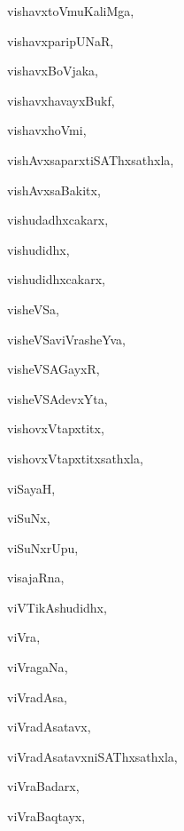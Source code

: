 \begin{multicols}{3}
{\noindent
{vishavxtoVmuKaliMga}, \pageref{vishavxtoVmuKaliMga}

\noindent
{vishavxparipUNaR}, \pageref{vishavxparipUNaR}

\noindent
{vishavxBoVjaka}, \pageref{vishavxBoVjaka}

\noindent
{vishavxhavayxBukf}, \pageref{vishavxhavayxBukf}

\noindent
{vishavxhoVmi}, \pageref{vishavxhoVmi}

\noindent
{vishAvxsaparxtiSAThxsathxla}, \pageref{vishAvxsaparxtiSAThxsathxla}

\noindent
{vishAvxsaBakitx}, \pageref{vishAvxsaBakitx}

\noindent
{vishudadhxcakarx}, \pageref{vishudadhxcakarx}

\noindent
{vishudidhx}, \pageref{vishudidhx}

\noindent
{vishudidhxcakarx}, \pageref{vishudidhxcakarx}

\noindent
{visheVSa}, \pageref{visheVSa}

\noindent
{visheVSaviVrasheYva}, \pageref{visheVSaviVrasheYva}

\noindent
{visheVSAGayxR}, \pageref{visheVSAGayxR}

\noindent
{visheVSAdevxYta}, \pageref{visheVSAdevxYta}

\noindent
{vishovxVtapxtitx}, \pageref{vishovxVtapxtitx}

\noindent
{vishovxVtapxtitxsathxla}, \pageref{vishovxVtapxtitxsathxla}

\noindent
{viSayaH}, \pageref{viSayaH}

\noindent
{viSuNx}, \pageref{viSuNx}

\noindent
{viSuNxrUpu}, \pageref{viSuNxrUpu}

\noindent
{visajaRna}, \pageref{visajaRna}

\noindent
{viVTikAshudidhx}, \pageref{viVTikAshudidhx}

\noindent
{viVra}, \pageref{viVra}

\noindent
{viVragaNa}, \pageref{viVragaNa}

\noindent
{viVradAsa}, \pageref{viVradAsa}

\noindent
{viVradAsatavx}, \pageref{viVradAsatavx}

\noindent
{viVradAsatavxniSAThxsathxla}, \pageref{viVradAsatavxniSAThxsathxla}

\noindent
{viVraBadarx}, \pageref{viVraBadarx}

\noindent
{viVraBaqtayx}, \pageref{viVraBaqtayx}

}
\end{multicols}
